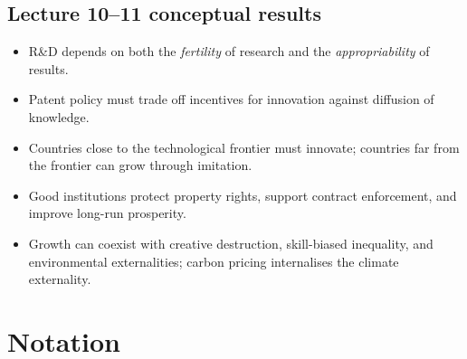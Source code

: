 \documentclass[12pt]{article}
\begin{document}
\subsection*{Lecture 10--11 conceptual results}
\begin{itemize}[leftmargin=1.5em]
\item R\&D depends on both the \emph{fertility} of research and the \emph{appropriability} of results.
\item Patent policy must trade off incentives for innovation against diffusion of knowledge.
\item Countries close to the technological frontier must innovate; countries far from the frontier can grow through imitation.
\item Good institutions protect property rights, support contract enforcement, and improve long-run prosperity.
\item Growth can coexist with creative destruction, skill-biased inequality, and environmental externalities; carbon pricing internalises the climate externality.
\end{itemize}




\section{Notation}
\end{document}
